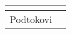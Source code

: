 \documentclass[../../main.tex]{subfiles}
\begin{document}
\begin{longtable}{| p{} | p{} |}
\begin{itemize}
    \end{itemize} \\
\hline
    Podtokovi & %
 

\end{longtable}
\end{document}
